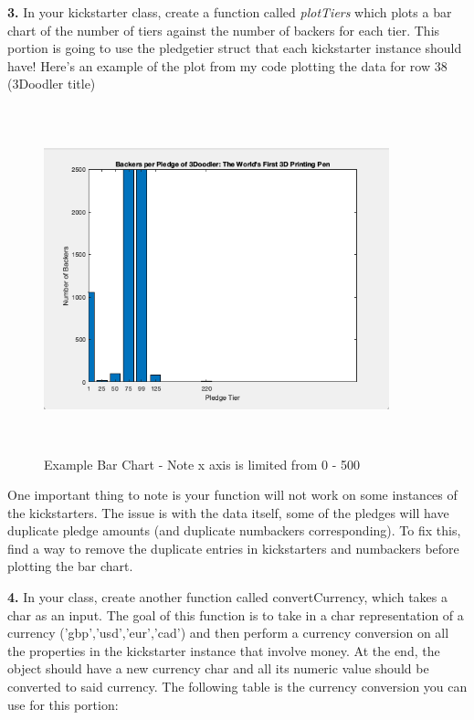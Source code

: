 \documentclass[11pt]{article}
\begin{document}
 \bigskip
 \noindent \textbf{3.} In your kickstarter class, create a function called \emph{plotTiers} which plots a bar chart of the number of tiers against the number of backers for each tier. This portion is going to use the pledgetier struct that each kickstarter instance should have! Here's an example of the plot from my code plotting the data for row 38 (3Doodler title)
 
 \begin{figure}[ht]
     \centering
     \includegraphics[width=10cm,height=10cm,keepaspectratio]{example.png}
     \caption{Example Bar Chart - Note x axis is limited from 0 - 500}
     \label{fig:my_label}
 \end{figure}
 
 \medskip
 \noindent
 One important thing to note is your function will not work on some instances of the kickstarters. The issue is with the data itself, some of the pledges will have duplicate pledge amounts (and duplicate numbackers corresponding). To fix this, find a way to remove the duplicate entries in kickstarters and numbackers before plotting the bar chart.
 
 \bigskip
 \noindent \textbf{4.} In your class, create another function called convertCurrency, which takes a char as an input. The goal of this function is to take in a char representation of a currency (’gbp’,’usd’,’eur’,’cad’) and then perform a currency conversion on all the properties in the kickstarter instance that involve money. At the end, the object should have a new currency char and all its numeric value should be converted to said currency. The following table is the currency conversion you can use for this portion:
 
\end{document}
